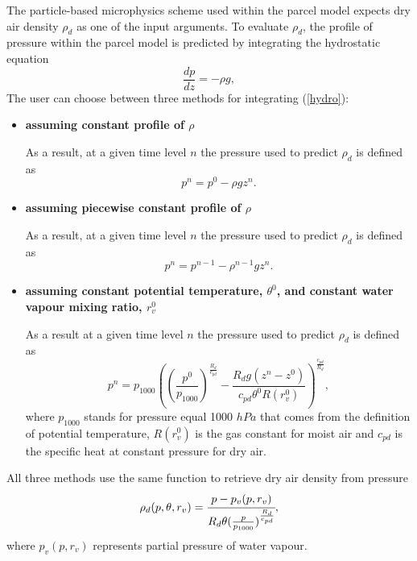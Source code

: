 \documentclass[11pt]{article}
\begin{document}
The particle-based microphysics scheme used within the parcel model expects dry air density $\rho_d$ as one of the input arguments.
To evaluate $\rho_d$, the profile of pressure within the parcel model is predicted by integrating the hydrostatic equation
\begin{equation}
	\frac{dp}{dz} = -\rho g,
	\label{hydro}
\end{equation}
The user can choose between three methods for integrating (\ref{hydro}):

\begin{itemize}
  \item{ {\bf assuming constant profile of $\rho$}
  
  As a result, at a given time level $n$ the pressure used to predict $\rho_d$ is defined as 
  \begin{equation*}
    p^n = p^0 - \rho g z^n .
  \end{equation*}
  } 

  \item{ {\bf assuming piecewise constant profile of  $\rho$}

  As a result, at a given time level $n$ the pressure used to predict $\rho_d$ is defined as
  \begin{equation*}
    p^n = p^{n-1} - \rho^{n-1} g z^n .
  \end{equation*}
  } 

  \item{ {\bf assuming constant potential temperature, $\theta^0$, and constant water vapour mixing ratio, $r_v^0$}

  As a result at a given time level $n$ the pressure used to predict $\rho_d$ is defined as
  \begin{equation*}
    p^n = p_{1000} \left( (\frac{p^0}{p_{1000}})^{\frac{R_d}{c_{pd}}} - \frac{R_d g (z^n - z^0)}{c_{pd} \theta^{0} R(r_v^0)} \right) ^ {\frac{c_{pd}}{R_d}} ,
  \end{equation*}
  \noindent
  where $p_{1000}$ stands for pressure equal 1000 $hPa$ that comes from the definition of potential temperature, 
        $R(r_v^0)$ is the gas constant for moist air and
        $c_{pd}$ is the specific heat at constant pressure for dry air.
  }
\end{itemize}
\noindent
All three methods use the same function to retrieve dry air density from pressure
\begin{equation}
  \rho_{d}(p, \theta, r_v) = \cfrac{p - p_v(p, r_v)}{ R_d \theta (\frac{p}{p_{1000}})^{\frac{R_d}{c_{pd}}}},
\end{equation}
\noindent
where $p_v(p, r_v)$ represents partial pressure of water vapour.
\end{document}
